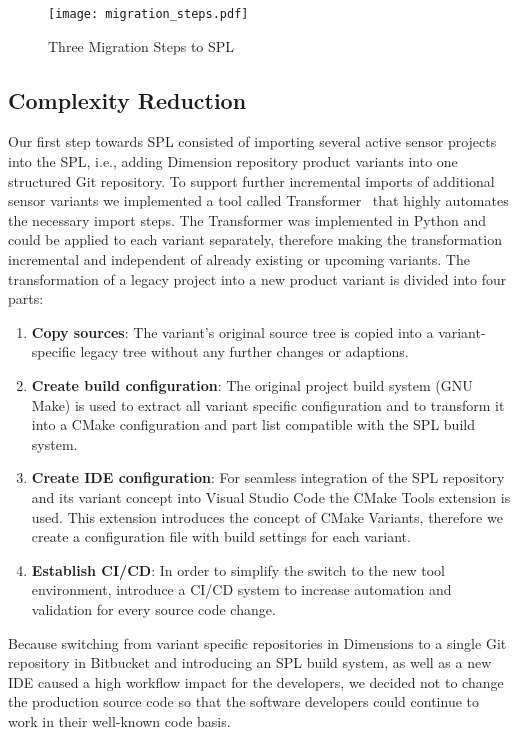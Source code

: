 \begin{figure*}[ht]
  \centering
  \texttt{[image: migration\_steps.pdf]}
  \caption{Three Migration Steps to SPL}
  \label{fig:threeMigrationSteps}
\end{figure*}

\subsection{Complexity Reduction}\label{complexity}

Our first step towards SPL consisted of importing several active sensor projects into
the SPL, i.e., adding Dimension repository product variants into one structured Git
repository. To support further incremental imports of additional sensor variants
we implemented a tool called Transformer~\cite{GithubTransformer} that highly
automates the necessary import steps. The Transformer was implemented in Python
and could be applied to each variant separately, therefore making the transformation
incremental and independent of already existing or upcoming variants. The transformation
of a legacy project into a new product variant is divided into four parts:

\begin{enumerate}
  \item \textbf{Copy sources}: The variant's original source tree is copied
        into a variant-specific legacy tree without any further changes or
        adaptions.
  \item \textbf{Create build configuration}: The original project build
        system (GNU Make) is used to extract all variant specific configuration and
        to transform it into a CMake configuration and part list compatible with
        the SPL build system.
  \item \textbf{Create IDE configuration}: For seamless integration of the SPL
        repository and its variant concept into Visual Studio Code the
        CMake Tools extension is used. This extension introduces the concept of CMake
        Variants, therefore we create a configuration file with build settings
        for each variant.
  \item \textbf{Establish CI/CD}: In order to simplify the switch to the new
        tool environment, introduce a CI/CD system to increase automation and
        validation for every source code change.
\end{enumerate}

Because switching from variant specific repositories in Dimensions to a single
Git repository in Bitbucket and introducing an SPL build system, as well as a
new IDE caused a high workflow impact for the developers, we decided not to
change the production source code so that the software developers could continue
to work in their well-known code basis.

